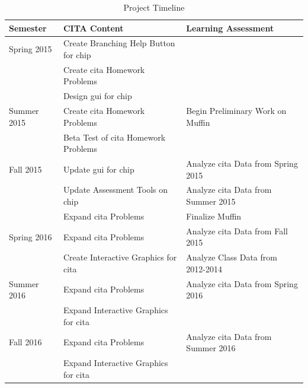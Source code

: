 \pagebreak

\begin{landscape}
\begin{table}[!ht]
  \centering
  \begin{tabular}{|l|l|l|}
    \hline
    \textbf{Semester} & \textbf{CITA Content} & \textbf{Learning Assessment}\\
	\hline
	Spring 2015 & Create Branching Help Button for \gls{chip} & \\
	& Create \gls{cita} Homework Problems & \\
	& Design \gls{gui} for \gls{chip} & \\
	\hline
	Summer 2015 & Create \gls{cita} Homework Problems & Begin Preliminary Work on Muffin\\
	& Beta Test of \gls{cita} Homework Problems &  \\
	\hline
	Fall 2015 & Update \gls{gui} for \gls{chip} & Analyze \gls{cita} Data from Spring 2015 \\
	& Update Assessment Tools on \gls{chip} & Analyze \gls{cita} Data from Summer 2015 \\
	& Expand \gls{cita} Problems & Finalize Muffin \\
	\hline
	Spring 2016 & Expand \gls{cita} Problems & Analyze \gls{cita} Data from Fall 2015 \\
	& Create Interactive Graphics for \gls{cita} & Analyze Class Data from 2012-2014 \\
	\hline
	Summer 2016 & Expand \gls{cita} Problems & Analyze \gls{cita} Data from Spring 2016 \\
	& Expand Interactive Graphics for \gls{cita} & \\
	\hline
	Fall 2016 & Expand \gls{cita} Problems & Analyze \gls{cita} Data from Summer 2016 \\
	& Expand Interactive Graphics for \gls{cita} & \\
	\hline
  \end{tabular}
  \caption{Project Timeline}
  \label{tab:timeline}
\end{table}
\end{landscape}